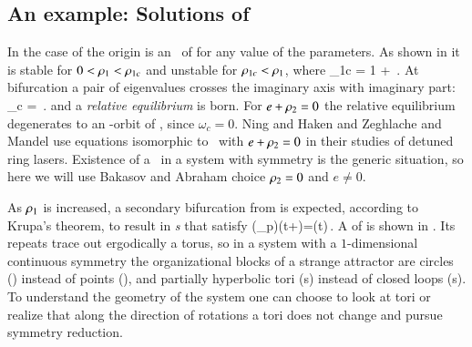 
\subsection{\label{s:CLEsols} An example: Solutions of \cLe}

In the case of {\cLe}  the origin  is an \eqv\ of
 for any value of the parameters. As shown in
 it is stable for $0<\rho_1<\rho_{1c}$
and unstable for $\rho_{1c}<\rho_1$, where
\beq
	\rho_{1c} = 1 + \,.
\eeq
At bifurcation a pair of eigenvalues crosses the imaginary
axis with imaginary part:
\beq
	\omega_c = \,.
	\label{eq:omegaCLE}
\eeq
and a \emph{relative equilibrium}  is born. For
$e+\rho_2=0$ the relative equilibrium degenerates to an
-orbit of \eqva{}, since $\omega_c =0$.
Ning and Haken and Zeghlache and
Mandel use equations isomorphic to \cLe\ with
$e+\rho_2=0$ in their studies of detuned ring lasers.
Existence of a \reqv\ in a system with  symmetry is
the generic situation, so here we will use Bakasov and
Abraham choice $\rho_2=0$ and $e \neq
0$.

As $\rho_1$ is increased,  a secondary bifurcation from
 is expected, according to Krupa's
theorem, to result in \emph{\rpo s} that satisfy
\beq
    \LieEl(\gSpace_p)\ssp(t+)=\ssp(t)\,.
\eeq
A {\rpo} of {\cLe} is shown in . Its repeats
trace out ergodically a torus, so in a system with a
$1$-dimensional continuous symmetry the organizational blocks
of a strange attractor are circles (\reqva) instead of points
(\eqva), and partially hyperbolic tori (\rpo s) instead of
closed loops (\po s). To understand the geometry of the
system one can choose to look at tori or realize that along
the direction of rotations a tori does not change and pursue
symmetry reduction.


